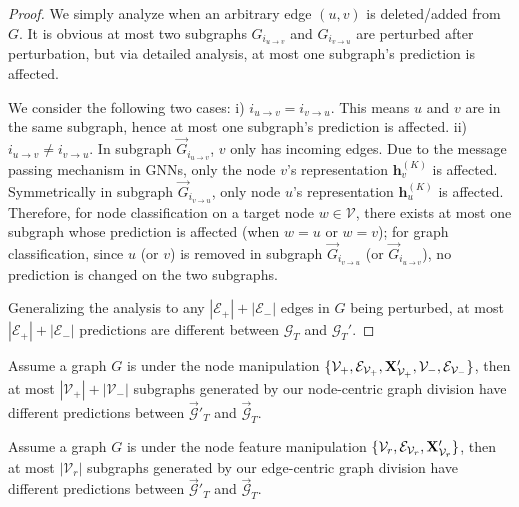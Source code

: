 \begin{proof}
We simply analyze when an arbitrary edge $(u, v)$ is deleted/added from $G$. It is obvious at most two subgraphs $G_{i_{u \rightarrow v} }$ and $G_{i_{v \rightarrow u} }$ are perturbed after perturbation, but via detailed analysis, at most one subgraph's prediction is affected. 

We consider the following two cases: i)  $i_{u \rightarrow v} = i_{v \rightarrow u}$. This means $u$ and $v$ are in the same subgraph, hence at most one subgraph's prediction is affected. ii) $i_{u \rightarrow v} \neq i_{v \rightarrow u}$. In subgraph $\vec{G}_{i_{u \rightarrow v}}$, $v$ only has incoming edges. Due to the message passing mechanism in GNNs, only the node $v$'s representation $\bm{h}_v^{(K)}$ is affected. Symmetrically in subgraph $\vec{G}_{i_{v \rightarrow u}}$,  only node $u$'s representation $\bm{h}_u^{(K)}$ is affected. Therefore, for node classification on a target node $w \in \mathcal{V}$, there exists at most one subgraph whose prediction is affected (when $w=u$ or $w=v$); for  graph classification, since $u$ (or $v$) is removed in subgraph $\vec{G}_{i_{v \rightarrow u}}$ (or $\vec{G}_{i_{u \rightarrow v}}$), no prediction is changed on the two subgraphs.


Generalizing the analysis to any $|\mathcal{E}_+| + |\mathcal{E}_-|$ edges in $G$ being perturbed, at most $|\mathcal{E}_+| + |\mathcal{E}_-|$ predictions are different between $\mathcal{G}_{T}$ and  $\mathcal{G}_{T}'$.  
\vspace{-2mm}
\end{proof}


\begin{theorem}[]
\label{thm:nodeperturb2} 
Assume a graph $G$ is under the node manipulation  
$\{\mathcal{V}_+, \mathcal{E}_{\mathcal{V}_+}, {\bf X}'_{\mathcal{V}_+}, \mathcal{V}_-, \mathcal{E}_{\mathcal{V}_-}\}$,
then at most $|\mathcal{V}_+| + |\mathcal{V}_-| $ subgraphs generated by our node-centric graph division have different predictions between $\vec{\mathcal{G}}'_T$ and $\vec{\mathcal{G}}_T$. 
\end{theorem}

\begin{theorem}[]
\label{thm:nodefeaperturb2} 
Assume a graph $G$ is under the node feature manipulation 
$\{\mathcal{V}_r, \mathcal{E}_{\mathcal{V}_r},{\bf X}'_{\mathcal{V}_r}\}$, 
then at most $|\mathcal{V}_r|$ subgraphs generated by our edge-centric graph division have different predictions between $\vec{\mathcal{G}}'_T$ and $\vec{\mathcal{G}}_T$. 
\end{theorem}


